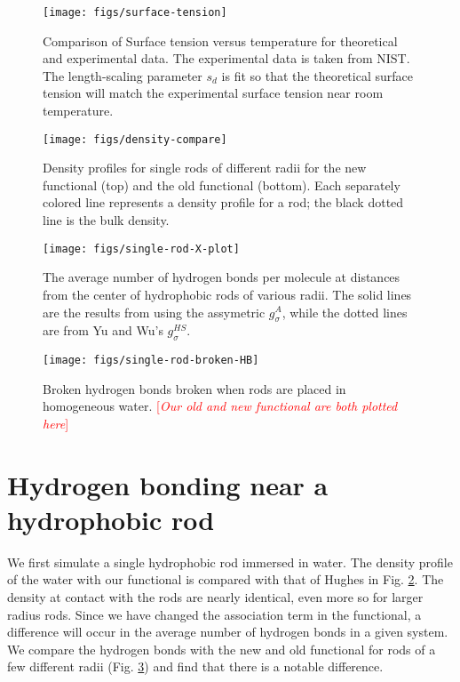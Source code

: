 \documentclass[twocolumn,amsmath,amssymb,prl]{revtex4-1}
\newcommand\lscale{\ensuremath{s_d}}
\newcommand{\fixme}[1]{\textcolor{red}{[\emph{#1}]}}
\begin{document}
\begin{figure}
\begin{center}
\texttt{[image: figs/surface-tension]}
\end{center}
\caption{Comparison of Surface tension versus temperature for theoretical and
  experimental data. The experimental data is taken from NIST.\cite{nistwater}
  The length-scaling parameter $\lscale$ is fit so that the theoretical surface 
  tension will match the experimental surface tension near room temperature.}
\label{fig:surface-tension}
\end{figure}

\begin{figure}
\begin{center}
\texttt{[image: figs/density-compare]}
\end{center}
\caption{ Density profiles for single rods of different
  radii for the new functional (top) and the old functional
  (bottom). Each separately colored line represents a density profile
  for a rod; the black dotted line is the bulk density.}
\label{fig:density-single-rod}
\end{figure}  

\begin{figure}
\begin{center}
\texttt{[image: figs/single-rod-X-plot]}
\end{center}
\caption{ The average number of hydrogen bonds per molecule at
  distances from the center of hydrophobic rods of various
  radii. The solid lines are the results from using the assymetric
  $g_{\sigma}^A$, while the dotted lines are from Yu and Wu's $g_{\sigma}^{HS}$.}
\label{fig:single-rod-X}
\end{figure}

\begin{figure}
\begin{center}
\texttt{[image: figs/single-rod-broken-HB]}
\end{center}
\caption{ Broken hydrogen bonds broken when rods are placed in
  homogeneous water.  \fixme{Our old and new functional are both plotted here}}
\label{fig:single-rod-broken-HB}
\end{figure}

\section{Hydrogen bonding near a hydrophobic rod}

We first simulate a single hydrophobic rod immersed in water. The
density profile of the water with our functional is compared with that
of Hughes in Fig. \ref{fig:density-single-rod}. The density at contact
with the rods are nearly identical, even more so for larger radius
rods. Since we have changed the association term in the functional, a
difference will occur in the average number of hydrogen bonds in a
given system. We compare the hydrogen bonds with the new and old
functional for rods of a few different radii
(Fig. \ref{fig:single-rod-X}) and find that there is a notable
difference.
\end{document}
